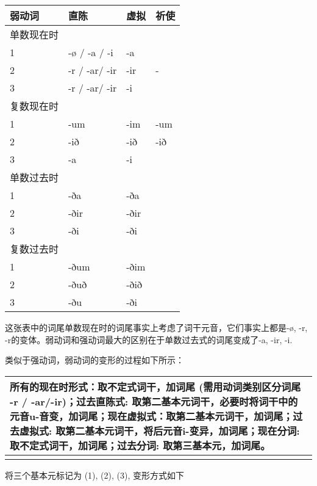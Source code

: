 \begin{longtable}{llll}
  \toprule
  弱动词     & 直陈          & 虚拟 & 祈使 \\
  \midrule
  \endhead
  \bottomrule
  \endfoot
  单数现在时 &               &      &      \\
  1          & -ø / -a / -i  & -a   &      \\
  2          & -r / -ar/ -ir & -ir  & -    \\
  3          & -r / -ar/ -ir & -i   &      \\
  复数现在时 &               &      &      \\
  1          & -um           & -im  & -um  \\
  2          & -ið           & -ið  & -ið  \\
  3          & -a            & -i   &      \\
  单数过去时 &               &      &      \\
  1          & -ða           & -ða  &      \\
  2          & -ðir          & -ðir &      \\
  3          & -ði           & -ði  &      \\
  复数过去时 &               &      &      \\
  1          & -ðum          & -ðim &      \\
  2          & -ðuð          & -ðið &      \\
  3          & -ðu           & -ði  &      \\
\end{longtable}

这张表中的词尾单数现在时的词尾事实上考虑了词干元音，它们事实上都是-ø,
-r, -r的变体。弱动词和强动词最大的区别在于单数过去式的词尾变成了-a, -ir,
-i.

类似于强动词，弱动词的变形的过程如下所示：

\begin{longtable}{l}
  \toprule
  所有的现在时形式：取不定式词干，加词尾 (需用动词类别区分词尾 -r / -ar/-ir)；过去直陈式: 取第二基本元词干，必要时将词干中的元音u-音变，加词尾；现在虚拟式：取第二基本元词干，加词尾；过去虚拟式: 取第二基本元词干，将后元音i-变异，加词尾；现在分词: 取不定式词干，加词尾；过去分词: 取第三基本元，加词尾。 \\
  \midrule
  \endhead
  \bottomrule
  \endfoot
\end{longtable}

将三个基本元标记为 (1), (2), (3), 变形方式如下

